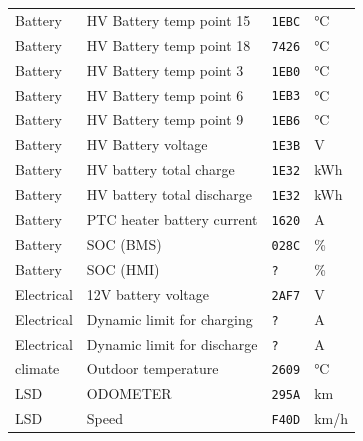 \begin{longtable}{@{}llll@{}}
Battery & HV Battery temp point 15 & \texttt{1EBC} & °C \\
Battery & HV Battery temp point 18 & \texttt{7426} & °C \\
Battery & HV Battery temp point 3 & \texttt{1EB0} & °C \\
Battery & HV Battery temp point 6 & \texttt{1EB3} & °C \\
Battery & HV Battery temp point 9 & \texttt{1EB6} & °C \\
Battery & HV Battery voltage & \texttt{1E3B} & V \\
Battery & HV battery total charge & \texttt{1E32} & kWh \\
Battery & HV battery total discharge & \texttt{1E32} & kWh \\
Battery & PTC heater battery current & \texttt{1620} & A \\
Battery & SOC (BMS) & \texttt{028C} & \% \\
Battery & SOC (HMI) & \texttt{?} & \% \\
Electrical & 12V battery voltage & \texttt{2AF7} & V \\
Electrical & Dynamic limit for charging & \texttt{?} & A \\
Electrical & Dynamic limit for discharge & \texttt{?} & A \\
climate & Outdoor temperature & \texttt{2609} & °C \\
LSD & ODOMETER & \texttt{295A} & km \\
LSD & Speed & \texttt{F40D} & km/h \\
\bottomrule
\end{longtable}
